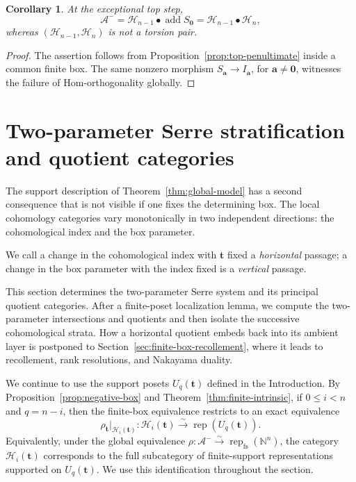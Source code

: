 \documentclass[12pt,reqno]{amsart}
\newtheorem{corollary}[theorem]{Corollary}
\theoremstyle{definition}
\theoremstyle{remark}
\newcommand{\Rep}{\operatorname{rep}}
\begin{document}
\begin{corollary}\label{cor:global-top-extension}
At the exceptional top step,
\[
\mathcal A^-=
\mathcal H_{n-1}\bullet\operatorname{add}S_{\mathbf0}
=
\mathcal H_{n-1}\bullet\mathcal H_n,
\]
whereas $(\mathcal H_{n-1},\mathcal H_n)$ is not a torsion pair.
\end{corollary}

\begin{proof}
The assertion follows from Proposition~\ref{prop:top-penultimate} inside a
common finite box.  The same nonzero morphism
$S_{\mathbf a}\to I_{\mathbf a}$, for $\mathbf a\ne\mathbf0$, witnesses the
failure of Hom-orthogonality globally.
\end{proof}

\section{Two-parameter Serre stratification and quotient categories}\label{sec:quotients}

The support description of Theorem~\ref{thm:global-model} has a second consequence that is not visible if one fixes the determining box.  The local cohomology categories vary monotonically in two independent directions: the cohomological index and the box parameter.

We call a change in the cohomological index with $\mathbf t$ fixed a
\emph{horizontal} passage; a change in the box parameter with the index fixed
is a \emph{vertical} passage.

This section determines the two-parameter Serre system and its principal
quotient categories.  After a finite-poset localization lemma, we compute the
two-parameter intersections and quotients and then isolate the successive
cohomological strata.  How a horizontal quotient embeds back into its ambient
layer is postponed to Section~\ref{sec:finite-box-recollement}, where it leads
to recollement, rank resolutions, and Nakayama duality.

We continue to use the support posets $U_q(\mathbf t)$ defined in the
Introduction.  By Proposition~\ref{prop:negative-box} and
Theorem~\ref{thm:finite-intrinsic}, if $0\le i<n$ and $q=n-i$, then the
finite-box equivalence restricts to an exact equivalence
\[
\rho_{\mathbf t}|_{\mathcal H_i(\mathbf t)}:
\mathcal H_i(\mathbf t)\xrightarrow{\sim}\Rep(U_q(\mathbf t)).
\]
Equivalently, under the global equivalence
$\rho:\mathcal A^-\xrightarrow{\sim}\Rep_{\mathrm{fs}}(\mathbb N^n)$,
the category $\mathcal H_i(\mathbf t)$ corresponds to the full subcategory of
finite-support representations supported on $U_q(\mathbf t)$.  We use this
identification throughout the section.
\end{document}
